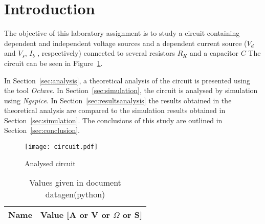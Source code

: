 \section{Introduction}
\label{sec:introduction}

The objective of this laboratory assignment is to study a circuit containing
dependent and independent voltage sources and a dependent current source ($V_d$ and $V_s$, $I_b$ , respectively) connected to several resistors $R_K$ and a capacitor $C$
The circuit can be seen in Figure~\ref{fig:circuit}.

In Section~\ref{sec:analysis}, a theoretical analysis of the circuit is
presented using the tool \textit{Octave}. In Section~\ref{sec:simulation}, the circuit is analysed by
simulation using \textit{Ngspice}. In Section~\ref{sec:resultsanalysis} the results obtained in the theoretical analysis are compared to the simulation results obtained in
Section~\ref{sec:simulation}. The conclusions of this study are outlined in
Section~\ref{sec:conclusion}.

\begin{figure}[h] \centering
\texttt{[image: circuit.pdf]}
\caption{Analysed circuit}
\label{fig:circuit}
\end{figure}

\begin{table}[h]
  \centering
  \begin{tabular}{|l|r|}
    \hline    
    {\bf Name} & {\bf Value [A or V or $\Omega$ or S]} \\ \hline
    
  \end{tabular}
  \caption{Values given in document datagen(python)}
  \label{tab:Res}
\end{table}
